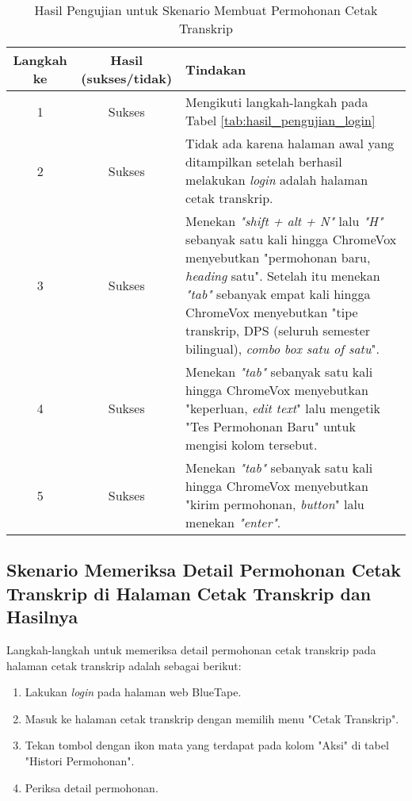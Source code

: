 \begin{table}[H]
    \centering 
    \caption{Hasil Pengujian untuk Skenario Membuat Permohonan Cetak Transkrip}
    \label{tab:hasil_pengujian_membuat_permohonan_cetak_transkrip}
    \begin{tabular}{|c|c|p{10cm}|}
        \toprule
        Langkah ke & Hasil (sukses/tidak) & Tindakan \\

        \midrule
        1 & Sukses & Mengikuti langkah-langkah pada Tabel \ref{tab:hasil_pengujian_login} \\
        2 & Sukses & Tidak ada karena halaman awal yang ditampilkan setelah berhasil melakukan \textit{login} adalah halaman cetak transkrip. \\
        3 & Sukses & Menekan \textit{"shift + alt + N"} lalu \textit{"H"} sebanyak satu kali hingga ChromeVox menyebutkan "permohonan baru, \textit{heading} satu". Setelah itu menekan \textit{"tab"} sebanyak empat kali hingga ChromeVox menyebutkan "tipe transkrip, DPS (seluruh semester bilingual), \textit{combo box satu of satu}". \\
        4 & Sukses & Menekan \textit{"tab"} sebanyak satu kali hingga ChromeVox menyebutkan "keperluan, \textit{edit text}" lalu mengetik "Tes Permohonan Baru" untuk mengisi kolom tersebut. \\
        5 & Sukses & Menekan \textit{"tab"} sebanyak satu kali hingga ChromeVox menyebutkan "kirim permohonan, \textit{button}" lalu menekan \textit{"enter"}. \\

        \bottomrule

    \end{tabular}
\end{table}

\subsection{Skenario Memeriksa Detail Permohonan Cetak Transkrip di Halaman Cetak Transkrip dan Hasilnya}
\label{subsec:skenario_memeriksa_detail_permohonan_cetak_transkrip_di_halaman_cetak_transkrip}
Langkah-langkah untuk memeriksa detail permohonan cetak transkrip pada halaman cetak transkrip adalah sebagai berikut:

\begin{enumerate}
    \item Lakukan \textit{login} pada halaman web BlueTape.
    \item Masuk ke halaman cetak transkrip dengan memilih menu "Cetak Transkrip".
    \item Tekan tombol dengan ikon mata yang terdapat pada kolom "Aksi" di tabel "Histori Permohonan".
    \item Periksa detail permohonan.
\end{enumerate}

